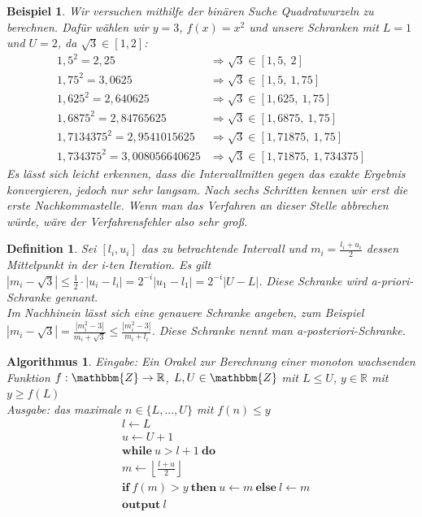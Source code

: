 \documentclass[12pt]{article}
\newcommand{\Z}{\mathbbm{Z}} %
\newcommand{\R}{\mathbb{R}} %
\newtheorem{definition}[satz]{Definition}
\newtheorem{beispiel}[satz]{Beispiel}
\newtheorem{algorithmus}[satz]{Algorithmus}
\begin{document}
\begin{beispiel}
   Wir versuchen mithilfe der binären Suche Quadratwurzeln zu berechnen. Dafür wählen wir $y=3$, $f(x)=x^2$ und unsere Schranken mit $L=1$ und $U=2$, da $\sqrt{3} \in [1,2]$: \\ 
   \begin{align*}
       1,5^2=2,25 &\Rightarrow \sqrt{3} \in [1,5,\: 2] \\
       1,75^2=3,0625 &\Rightarrow \sqrt{3} \in [1,5, \: 1,75] \\ 
       1,625^2=2,640625 &\Rightarrow \sqrt{3} \in [1,625, \: 1,75] \\
       1,6875^2=2,84765625 &\Rightarrow \sqrt{3} \in [1,6875, \: 1,75] \\
       1,7134375^2=2,9541015625 &\Rightarrow \sqrt{3} \in [1,71875, \: 1,75] \\
       1,734375^2=3,008056640625 &\Rightarrow \sqrt{3} \in [1,71875, \: 1,734375]
   \end{align*}
   Es lässt sich leicht erkennen, dass die Intervallmitten gegen das exakte Ergebnis konvergieren, jedoch nur sehr langsam. Nach sechs Schritten kennen wir erst die erste Nachkommastelle. Wenn man das Verfahren an dieser Stelle abbrechen würde, wäre der Verfahrensfehler also sehr groß.
   \label{binäre suche}
\end{beispiel}

\begin{definition}
    Sei $[l_i,u_i]$ das zu betrachtende Intervall und $m_i= \frac{l_i+u_i}{2}$ dessen Mittelpunkt in der i-ten Iteration. 
    Es gilt $|m_i-\sqrt{3}|\leq \frac{1}{2} \cdot|u_i-l_i|=2^{-i}|u_1-l_1|= 2^{-i}|U-L|$.
    Diese Schranke wird a-priori-Schranke gennant. \\
    Im Nachhinein lässt sich eine genauere Schranke angeben, zum Beispiel $|m_i-\sqrt{3}|=\frac{|m_i^2-3|}{m_i+ \sqrt{3}}\leq \frac{|m_i^2-3|}{m_i+l_i}$. Diese Schranke nennt man a-posteriori-Schranke. 
\end{definition}

\begin{algorithmus}
    Eingabe: Ein Orakel zur Berechnung einer monoton wachsenden Funktion $f: \Z \to \R$, $L,U \in \Z$ mit $L\leq U$, $y \in \R$ mit $y \geq f(L)$ \\ 
    Ausgabe: das maximale $n \in \{L,...,U\}$ mit $f(n) \leq y$ 
    \begin{align*}
        &l \leftarrow L \\ 
       &u  \leftarrow  U+1 \\
       &\textbf{while} \: u>l+1 \: \textbf{do} \\
       &m \leftarrow \left \lfloor \frac{l+u}{2} \right \rfloor \\
       & \textbf{if} \: f(m) > y \: \textbf{then} \: u \leftarrow m \: \textbf{else} \: l \leftarrow m \\ 
       & \textbf{output} \: l
    \end{align*}
    \label{binäre suche}
\end{algorithmus}
\end{document}
